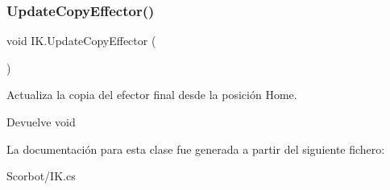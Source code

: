 \subsubsection{\texorpdfstring{UpdateCopyEffector()}{UpdateCopyEffector()}}
{\footnotesize\ttfamily void I\+K.\+Update\+Copy\+Effector (\begin{DoxyParamCaption}{ }\end{DoxyParamCaption})\hspace{0.3cm}{\ttfamily [inline]}}

Actualiza la copia del efector final desde la posición Home. \begin{DoxyReturn}{Devuelve}
void 
\end{DoxyReturn}


La documentación para esta clase fue generada a partir del siguiente fichero\+:\begin{DoxyCompactItemize}
\item 
Scorbot/I\+K.\+cs\end{DoxyCompactItemize}
